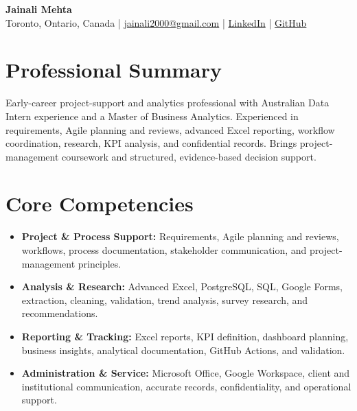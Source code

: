\documentclass[letterpaper,10pt]{article}
\begin{document}
\begin{center}
  {\fontsize{17}{19}\selectfont\textbf{Jainali Mehta}}\\[2pt]
  \small Toronto, Ontario, Canada \;|\;
  \href{mailto:jainali2000@gmail.com}{jainali2000@gmail.com} \;|\;
  \href{https://www.linkedin.com/in/jainali-mehta}{LinkedIn} \;|\;
  \href{https://github.com/jainalimehta}{GitHub}
\end{center}
\vspace{-7pt}

\section{Professional Summary}
\small Early-career project-support and analytics professional with Australian Data Intern experience and a Master of Business Analytics. Experienced in requirements, Agile planning and reviews, advanced Excel reporting, workflow coordination, research, KPI analysis, and confidential records. Brings project-management coursework and structured, evidence-based decision support.

\section{Core Competencies}
\begin{itemize}[leftmargin=0.16in,label=\textbullet,topsep=0pt,itemsep=1pt,parsep=0pt]
  \item \small \textbf{Project \& Process Support:} Requirements, Agile planning and reviews, workflows, process documentation, stakeholder communication, and project-management principles.
  \item \small \textbf{Analysis \& Research:} Advanced Excel, PostgreSQL, SQL, Google Forms, extraction, cleaning, validation, trend analysis, survey research, and recommendations.
  \item \small \textbf{Reporting \& Tracking:} Excel reports, KPI definition, dashboard planning, business insights, analytical documentation, GitHub Actions, and validation.
  \item \small \textbf{Administration \& Service:} Microsoft Office, Google Workspace, client and institutional communication, accurate records, confidentiality, and operational support.
\end{itemize}
\end{document}
